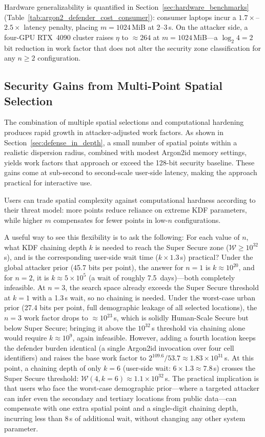 \documentclass[mathematics,article,accept,pdftex,moreauthors]{Definitions/mdpi}
\begin{document}
{Hardware generalizability is quantified in Section~\ref{sec:hardware_benchmarks} (Table~\ref{tab:argon2_defender_cost_consumer}): consumer laptops incur a $1.7\times$--$2.5\times$ latency penalty, placing $m=1024$\,MiB at 2--3\,s. On the attacker side, a four-GPU RTX~4090 cluster raises $\eta$ to $\approx$$264$ at $m=1024$\,MiB---a $\log_2 4 = 2$\,bit reduction in work factor that does not alter the security zone classification for any $n \geq 2$ configuration.}

\subsection{Security Gains from Multi-Point Spatial Selection}

The combination of multiple spatial selections and computational hardening produces rapid growth in attacker-adjusted work factors. As shown in Section~\ref{sec:defense_in_depth}, a small number of spatial points within a realistic dispersion radius, combined with modest Argon2id memory settings, yields work factors that approach or exceed the 128-bit security baseline. These gains come at sub-second to second-scale user-side latency, making the approach practical for interactive use.

Users can trade spatial complexity against computational hardness according to their threat model: more points reduce reliance on extreme KDF parameters, while higher $m$ compensates for fewer points in low-$n$ configurations.

{A useful way to see this flexibility is to ask the following: For each value of $n$, what KDF chaining depth $k$ is needed to reach the Super Secure zone ($\mathcal{W} \geq 10^{32}$\,s), and is the corresponding user-side wait time ($k \times 1.3$\,s) practical? Under the global attacker prior (45.7 bits per point), the answer for $n=1$ is $k \approx 10^{20}$, and for $n=2$, it is $k \approx 5 \times 10^5$ (a wait of roughly 7.5~days)---both completely infeasible. At $n=3$, the search space already exceeds the Super Secure threshold at $k=1$ with a 1.3\,s wait, so no chaining is needed. Under the worst-case urban prior (27.4 bits per point, full demographic leakage of all selected locations), the $n=3$ work factor drops to $\approx\!10^{23}$\,s, which is solidly Human-Scale Secure but below Super Secure; bringing it above the $10^{32}$\,s threshold via chaining alone would require $k \approx 10^9$, again infeasible. However, adding a fourth location keeps the defender burden identical (a single Argon2id invocation over four cell identifiers) and raises the base work factor to $2^{109.6}/53.7 \approx 1.83 \times 10^{31}$\,s. At this point, a chaining depth of only $k=6$ (user-side wait: $6 \times 1.3 \approx 7.8$\,s) crosses the Super Secure threshold: $\mathcal{W}(4, k=6) \approx 1.1 \times 10^{32}$\,s. The practical implication is that users who face the worst-case demographic prior---where a targeted attacker can infer even the secondary and tertiary locations from public data---can compensate with one extra spatial point and a single-digit chaining depth, incurring less than 8\,s of additional wait, without changing any other system parameter.}
\end{document}
